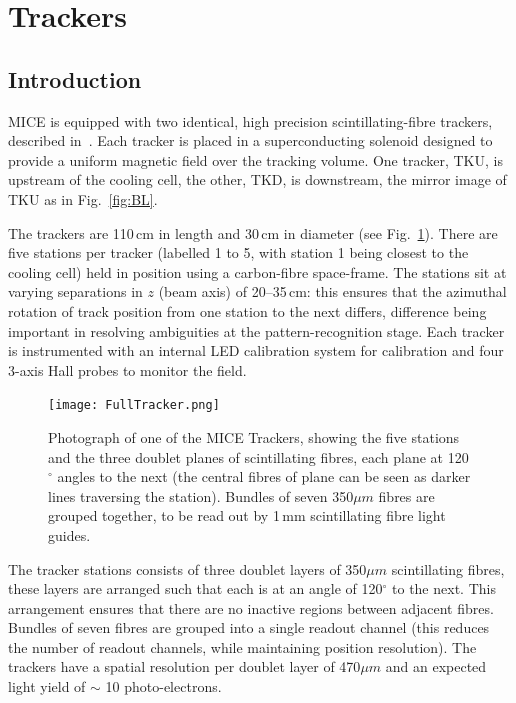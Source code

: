 \graphicspath{{06-Tracker/Figures/}}

\section{Trackers}
\label{Sect:Tracker}

\subsection{Introduction}
MICE is equipped with two identical, high precision scintillating-fibre trackers, described in~\cite{Ellis:2010bb}. Each tracker is placed in a superconducting solenoid designed to provide a uniform magnetic field over the tracking volume. One tracker, TKU, is upstream of the cooling cell, the other, TKD, is downstream, the mirror image of TKU as in Fig.~\ref{fig:BL}.

The trackers are 110\,cm in length and 30\,cm in diameter (see Fig.~\ref{Figure:FullTracker}). There are five stations per tracker (labelled 1 to 5, with station 1 being closest to the cooling cell) held in position using a carbon-fibre space-frame. The stations sit at varying separations in $z$ (beam axis) of 20--35\,cm: this ensures that the azimuthal rotation of track position from one station to the next differs, difference being important in resolving ambiguities at the pattern-recognition stage. Each tracker is instrumented with an internal LED calibration system for calibration and four 3-axis Hall probes to monitor the field.

\begin{figure}[ht]
\begin{center}
\texttt{[image: FullTracker.png]}
\end{center}
\caption{Photograph of one of the MICE Trackers, showing the five stations and the three doublet planes of scintillating fibres, each plane at 120$^\circ$ angles to the next (the central fibres of plane can be seen as darker lines traversing the station). Bundles of seven 350$\mu m$ fibres are grouped together, to be read out by 1\,mm scintillating fibre light guides.}
\label{Figure:FullTracker}
\end{figure}

The tracker stations consists of three doublet layers of 350$\mu m$ scintillating fibres, these layers are arranged such that each is at an angle of 120$^\circ$ to the next. This arrangement ensures that there are no inactive regions between adjacent fibres. Bundles of seven fibres are grouped into a single readout channel (this reduces the number of readout channels, while maintaining position resolution). The trackers have a spatial resolution per doublet layer of 470$\mu m$ and an expected light yield of $\sim$ 10 photo-electrons.


